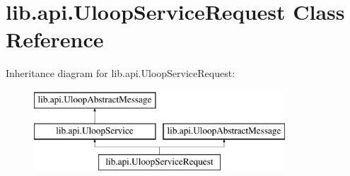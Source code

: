 \hypertarget{classlib_1_1api_1_1UloopServiceRequest}{\section{lib.\+api.\+Uloop\+Service\+Request Class Reference}
\label{classlib_1_1api_1_1UloopServiceRequest}
}
Inheritance diagram for lib.\+api.\+Uloop\+Service\+Request\+:\begin{figure}[H]
\begin{center}
\leavevmode
\includegraphics[height=3.000000cm]{classlib_1_1api_1_1UloopServiceRequest}
\end{center}
\end{figure}
